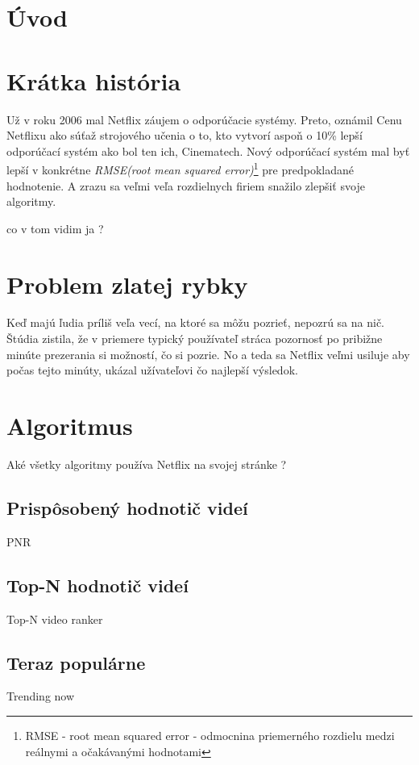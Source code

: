 \documentclass[10pt,twoside,slovak,a4paper]{article}
\begin{document}
\section{Úvod}

\section{Krátka história} \label{Netflix prize} %
Už v roku 2006 mal Netflix záujem o odporúčacie systémy.\cite{amatriain2015recommender} Preto, oznámil Cenu Netflixu ako súťaž strojového učenia o to, kto vytvorí aspoň o 10\% lepší odporúčací systém ako bol ten ich, Cinematech. Nový odporúčací systém mal byť lepší v konkrétne \textit{RMSE(root mean squared error)}\footnote{RMSE - root mean squared error - odmocnina priemerného rozdielu medzi reálnymi a očakávanými hodnotami\cite{EncyclopaediaBritannica}} pre predpokladané hodnotenie. A zrazu sa veľmi veľa rozdielnych firiem snažilo zlepšiť svoje algoritmy.

co v tom vidim ja ?

\section{Problem zlatej rybky} %
Keď majú ľudia príliš veľa vecí, na ktoré sa môžu pozrieť, nepozrú sa na nič. Štúdia \cite{10.1145/2843948} zistila, že v priemere typický používateľ stráca pozornosť po pribižne minúte prezerania si možností, čo si pozrie. No a teda sa Netflix veľmi usiluje aby počas tejto minúty, ukázal užívateľovi čo najlepší výsledok.

\section{Algoritmus}
Aké všetky algoritmy používa Netflix na svojej stránke ? \cite{10.1145/2843948}
\subsection{Prispôsobený hodnotič videí}
PNR
\subsection{Top-N hodnotič videí}
Top-N video ranker
\subsection{Teraz populárne}
Trending now
\end{document}
